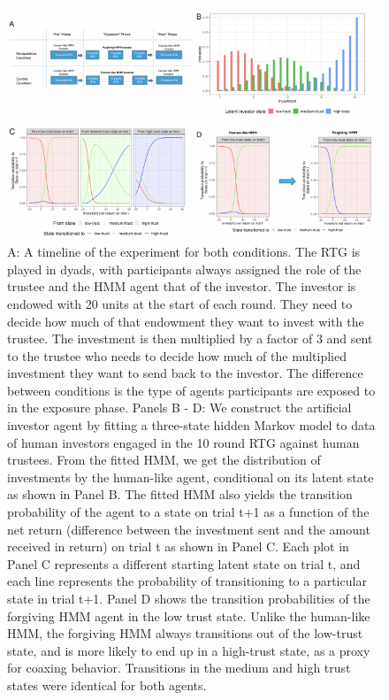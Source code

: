 \documentclass[
]{article}
\begin{document}
\begin{landscape}
\begin{figure}

{\centering \includegraphics[width=1\linewidth,height=1\textheight]{article_files/figure-latex/HMMPanels-1} 

}

\caption{\small{A: A timeline of the experiment for both conditions. The RTG is played in dyads, with participants always assigned the role of the trustee and the HMM agent that of the investor. The investor is endowed with 20 units at the start of each round. They need to decide how much of that endowment they want to invest with the trustee. The investment is then multiplied by a factor of 3 and sent to the trustee who needs to decide how much of the multiplied investment they want to send back to the investor. The difference between conditions is the type of agents participants are exposed to in the exposure phase. Panels B - D: We construct the artificial investor agent by fitting a three-state hidden Markov model to data of human investors engaged in the 10 round RTG against human trustees. From the fitted HMM, we get the distribution of investments by the human-like agent, conditional on its latent state as shown in Panel B. The fitted HMM also yields the transition probability of the agent to a state on trial t+1 as a function of the net return (difference between the investment sent and the amount received in return) on trial t as shown in Panel C. Each plot in Panel C represents a different starting latent state on trial t, and each line represents the probability of transitioning to a particular state in trial t+1. Panel D shows the transition probabilities of the forgiving HMM agent in the low trust state. Unlike the human-like HMM, the forgiving HMM always transitions out of the low-trust state, and is more likely to end up in a high-trust state, as a proxy for coaxing behavior. Transitions in the medium and high trust states were identical for both agents.}}\label{fig:HMMPanels}
\end{figure}
\end{landscape}
\end{document}
